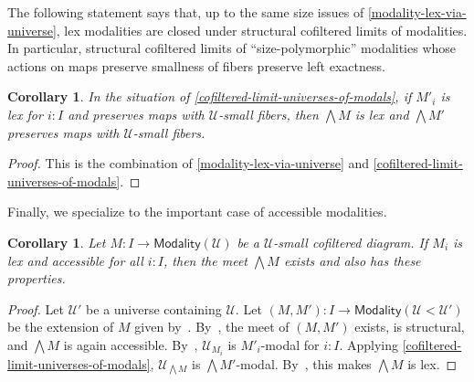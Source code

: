 \documentclass[10pt,a4paper,draft]{article}
\newcommand{\UU}{\mathcal{U}}%
\renewcommand{\~}{\widetilde}
\newcommand{\Modality}{\mathsf{Modality}}
\newcounter{diagram}
\newtheorem{corollary}[theorem]{Corollary}
\theoremstyle{definition}
\theoremstyle{remark} %
\begin{document}
The following statement says that, up to the same size issues of \cref{modality-lex-via-universe}, lex modalities are closed under structural cofiltered limits of modalities.
In particular, structural cofiltered limits of ``size\hyp{}polymorphic'' modalities whose actions on maps preserve smallness of fibers preserve left exactness.

\begin{corollary} \label{cofiltered-limit-lex}
In the situation of \cref{cofiltered-limit-universes-of-modals}, if $M'_i$ is lex for $i : I$ and preserves maps with $\UU$\hyp{}small fibers, then $\bigwedge M$ is lex and $\bigwedge M'$ preserves maps with $\UU$\hyp{}small fibers.
\end{corollary}

\begin{proof}
This is the combination of \cref{modality-lex-via-universe} and \cref{cofiltered-limit-universes-of-modals}.
\end{proof}

Finally, we specialize to the important case of accessible modalities.

\begin{corollary} \label{cofiltered-limit-lex-accessible}
Let $M : I \to \Modality(\UU)$ be a $\UU$\hyp{}small cofiltered diagram.
If $M_i$ is lex and accessible for all $i : I$, then the meet $\bigwedge M$ exists and also has these properties.
\end{corollary}

\begin{proof}
Let $\UU'$ be a universe containing $\UU$.
Let $(M, M') : I \to \Modality(\UU < \UU')$ be the extension of $M$ given by~\cite[Theorem~3.36]{RijkeSS17}.
By~\cite[Theorem~3.29]{RijkeSS17}, the meet of $(M, M')$ exists, is structural, and $\bigwedge M$ is again accessible.
By~\cite[Theorem~3.11]{RijkeSS17}, $\UU_{M_i}$ is $M'_i$\hyp{}modal for $i : I$.
Applying \cref{cofiltered-limit-universes-of-modals}, $\UU_{\bigwedge M}$ is $\bigwedge M'$\hyp{}modal.
By~\cite[Theorem~3.29]{RijkeSS17}, this makes $\bigwedge M$ is lex.
\end{proof}
\end{document}
